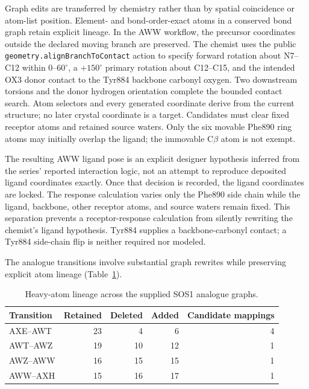 \documentclass[11pt]{article}
\begin{document}
\begin{small}
Graph edits are transferred by chemistry rather than by spatial coincidence or atom-list position. Element- and bond-order-exact atoms in a conserved bond graph retain explicit lineage. In the AWW workflow, the precursor coordinates outside the declared moving branch are preserved. The chemist uses the public \texttt{geometry.alignBranchToContact} action to specify forward rotation about N7--C12 within $0$--$60^{\circ}$, a $+150^{\circ}$ primary rotation about C12--C15, and the intended OX3 donor contact to the Tyr884 backbone carbonyl oxygen. Two downstream torsions and the donor hydrogen orientation complete the bounded contact search. Atom selectors and every generated coordinate derive from the current structure; no later crystal coordinate is a target. Candidates must clear fixed receptor atoms and retained source waters. Only the six movable Phe890 ring atoms may initially overlap the ligand; the immovable C$\beta$ atom is not exempt.

The resulting AWW ligand pose is an explicit designer hypothesis inferred from the series' reported interaction logic, not an attempt to reproduce deposited ligand coordinates exactly. Once that decision is recorded, the ligand coordinates are locked. The response calculation varies only the Phe890 side chain while the ligand, backbone, other receptor atoms, and source waters remain fixed. This separation prevents a receptor-response calculation from silently rewriting the chemist's ligand hypothesis. Tyr884 supplies a backbone-carbonyl contact; a Tyr884 side-chain flip is neither required nor modeled.

The analogue transitions involve substantial graph rewrites while preserving explicit atom lineage (Table~\ref{tab:appA_lineage}).

\begin{table}[htbp]
\centering\small
\caption{Heavy-atom lineage across the supplied SOS1 analogue graphs.}
\label{tab:appA_lineage}
\begin{tabular}{@{}lrrrr@{}}
\toprule
\textbf{Transition} & \textbf{Retained} & \textbf{Deleted} & \textbf{Added} & \textbf{Candidate mappings}\\
\midrule
AXE--AWT & 23 & 4 & 6 & 4\\
AWT--AWZ & 19 & 10 & 12 & 1\\
AWZ--AWW & 16 & 15 & 15 & 1\\
AWW--AXH & 15 & 16 & 17 & 1\\
\bottomrule
\end{tabular}
\end{table}


\end{small}
\end{document}
